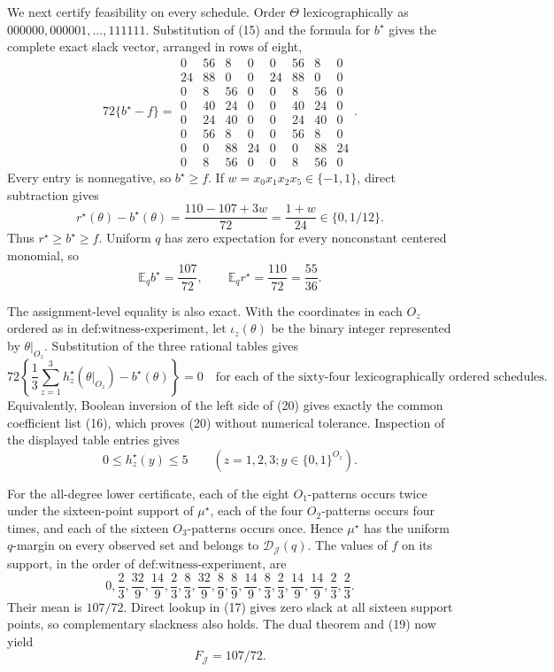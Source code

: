 We next certify feasibility on every schedule.  Order \(\Theta\) lexicographically as \(000000,000001,\ldots,111111\).  Substitution of (15) and the formula for \(b^\star\) gives the complete exact slack vector, arranged in rows of eight,
\[
72\{b^\star-f\}=\begin{array}{rrrrrrrr}
0&56&8&0&0&56&8&0\\
24&88&0&0&24&88&0&0\\
0&8&56&0&0&8&56&0\\
0&40&24&0&0&40&24&0\\
0&24&40&0&0&24&40&0\\
0&56&8&0&0&56&8&0\\
0&0&88&24&0&0&88&24\\
0&8&56&0&0&8&56&0
\end{array}. \tag{17}
\]
Every entry is nonnegative, so \(b^\star\ge f\).  If \(w=x_0x_1x_2x_5\in\{-1,1\}\), direct subtraction gives
\[
 r^\star(\theta)-b^\star(\theta)
 =\frac{110-107+3w}{72}=\frac{1+w}{24}\in\{0,1/12\}. \tag{18}
\]
Thus \(r^\star\ge b^\star\ge f\).  Uniform \(q\) has zero expectation for every nonconstant centered monomial, so
\[
 \mathbb E_qb^\star=\frac{107}{72},\quad\quad
 \mathbb E_qr^\star=\frac{110}{72}=\frac{55}{36}. \tag{19}
\]

The assignment-level equality is also exact.  With the coordinates in each \(O_z\) ordered as in \(\text{def:witness-experiment}\), let \(\iota_z(\theta)\) be the binary integer represented by \(\theta|_{O_z}\).  Substitution of the three rational tables gives
\[
 72\left\{\frac13\sum_{z=1}^3h_z^\star(\theta|_{O_z})
              -b^\star(\theta)\right\}=0
 \quad\text{for each of the sixty-four lexicographically ordered schedules}. \tag{20}
\]
Equivalently, Boolean inversion of the left side of (20) gives exactly the common coefficient list (16), which proves (20) without numerical tolerance.  Inspection of the displayed table entries gives
\[
 0\le h_z^\star(y)\le5\quad\quad(z=1,2,3; y\in\{0,1\}^{O_z}). \tag{21}
\]

For the all-degree lower certificate, each of the eight \(O_1\)-patterns occurs twice under the sixteen-point support of \(\mu^\star\), each of the four \(O_2\)-patterns occurs four times, and each of the sixteen \(O_3\)-patterns occurs once.  Hence \(\mu^\star\) has the uniform \(q\)-margin on every observed set and belongs to \(\mathcal D_{\mathcal J}(q)\).  The values of \(f\) on its support, in the order of \(\text{def:witness-experiment}\), are
\[
0,\frac23,\frac{32}{9},\frac{14}{9},\frac23,\frac83,
\frac{32}{9},\frac89,\frac89,\frac{14}{9},\frac83,\frac23,
\frac{14}{9},\frac{14}{9},\frac23,\frac23.
\]
Their mean is \(107/72\).  Direct lookup in (17) gives zero slack at all sixteen support points, so complementary slackness also holds.  The dual theorem and (19) now yield
\[
 F_{\mathcal J}=107/72. \tag{22}
\]

